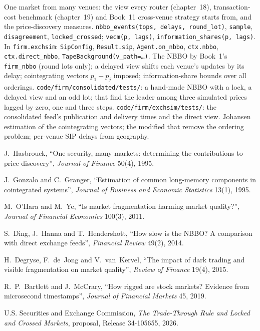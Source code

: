 \begin{build}
 One market from many venues: the view every router (chapter~18), transaction-cost benchmark (chapter~19) and Book~11 cross-venue
strategy starts from, and the price-discovery measures.
 \texttt{nbbo\_events(tops, delays, round\_lot)}, \texttt{sample}, \texttt{disagreement}, \texttt{locked\_crossed};
\texttt{vecm(p, lags)}, \texttt{information\_shares(p, lags)}. In \texttt{firm.exchsim}: \texttt{SipConfig}, \texttt{Result.sip},
\texttt{Agent.on\_nbbo}, \texttt{ctx.nbbo}, \texttt{ctx.direct\_nbbo}, \texttt{TapeBackground(v\_path=\dots)}.
 The NBBO by Book~1's \texttt{firm\_nbbo} (round lots only); a delayed view shifts each venue's updates by its delay; cointegrating
vectors $p_1-p_j$ imposed; information-share bounds over all orderings.
 \texttt{code/firm/consolidated/tests/}: a hand-made NBBO with a lock, a delayed view and an odd lot;  that
find the leader among three simulated prices lagged by zero, one and three steps. \texttt{code/firm/exchsim/tests/}: the consolidated feed's publication
and delivery times and the direct view.
 Johansen estimation of the cointegrating vectors; the modified  that remove the ordering problem; per-venue SIP
delays from geography.
\end{build}

\begin{omsources}
\item J.~Hasbrouck, ``One security, many markets: determining the contributions to price discovery'', \emph{Journal of Finance} 50(4), 1995.
\item J.~Gonzalo and C.~Granger, ``Estimation of common long-memory components in cointegrated systems'', \emph{Journal of Business and Economic
Statistics} 13(1), 1995.
\item M.~O'Hara and M.~Ye, ``Is market fragmentation harming market quality?'', \emph{Journal of Financial Economics} 100(3), 2011.
\item S.~Ding, J.~Hanna and T.~Hendershott, ``How slow is the NBBO? A comparison with direct exchange feeds'', \emph{Financial Review} 49(2), 2014.
\item H.~Degryse, F.~de~Jong and V.~van~Kervel, ``The impact of dark trading and visible fragmentation on market quality'', \emph{Review of Finance}
19(4), 2015.
\item R.~P.~Bartlett and J.~McCrary, ``How rigged are stock markets? Evidence from microsecond timestamps'', \emph{Journal of Financial Markets} 45, 2019.
\item U.S. Securities and Exchange Commission, \emph{The Trade-Through Rule and Locked and Crossed Markets}, proposal, Release 34-105655, 2026.
\end{omsources}

